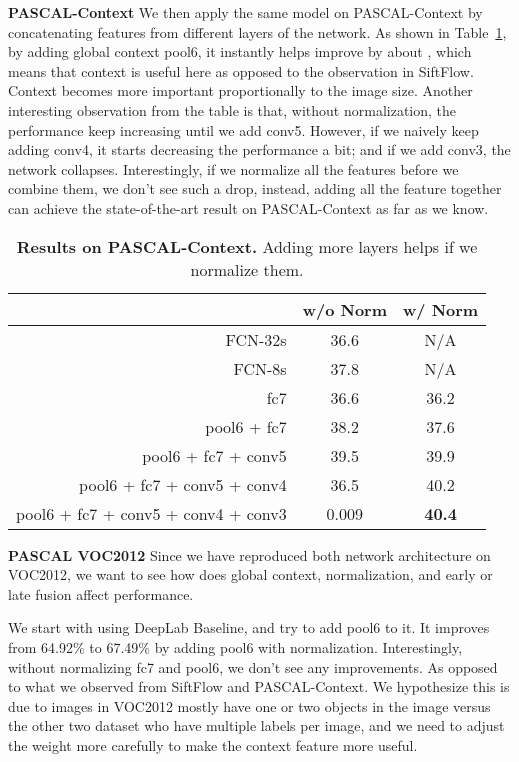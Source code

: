 \documentclass{article} \usepackage{iclr2016_conference}
\begin{document}
\noindent\textbf{PASCAL-Context} We then apply the same model on PASCAL-Context by concatenating features from different layers of the network. As shown in Table~\ref{tab:pascalcontext}, by adding global context pool6, it instantly helps improve by about , which means that context is useful here as opposed to the observation in SiftFlow. Context becomes more important proportionally to the image size. Another interesting observation from the table is that, without normalization, the performance keep increasing until we add conv5. However, if we naively keep adding conv4, it starts decreasing the performance a bit; and if we add conv3, the network collapses. Interestingly, if we normalize all the features before we combine them, we don't see such a drop, instead, adding all the feature together can achieve the state-of-the-art result on PASCAL-Context as far as we know.
\begin{table}[!htb]\small
	\centering
	\begin{tabular}{r|c|c}
		& w/o Norm & w/ Norm\\
		\hline\hline
		FCN-32s & 36.6 & N/A\\
		FCN-8s & 37.8 & N/A\\
		\hline
		fc7 & 36.6 & 36.2\\
		pool6 + fc7 & 38.2 & 37.6\\
		pool6 + fc7 + conv5 & 39.5 & 39.9\\
		pool6 + fc7 + conv5 + conv4 & 36.5 & 40.2\\
		pool6 + fc7 + conv5 + conv4 + conv3 & 0.009 & \textbf{40.4}\\
		\hline
	\end{tabular}
	\caption{\textbf{Results on PASCAL-Context.} Adding more layers helps if we  normalize them.}\label{tab:pascalcontext}
\end{table}
\vspace{-0.5em}

\noindent\textbf{PASCAL VOC2012} Since we have reproduced both network architecture on VOC2012, we want to see how does global context, normalization, and early or late fusion affect performance.

We start with using DeepLab Baseline, and try to add pool6 to it. It improves from 64.92\% to 67.49\% by adding pool6 with normalization. Interestingly, without normalizing fc7 and pool6, we don't see any improvements. As opposed to what we observed from SiftFlow and PASCAL-Context. We hypothesize this is due to images in VOC2012 mostly have one or two objects in the image versus the other two dataset who have multiple labels per image, and we need to adjust the weight more carefully to make the context feature more useful.
\end{document}
